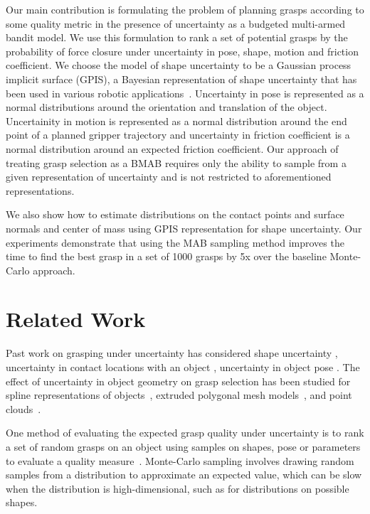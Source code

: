 \documentclass[journal,transmag]{IEEEtran}%
\begin{document}
Our main contribution is formulating the problem of planning grasps according to some quality metric in the presence of uncertainty as a budgeted multi-armed bandit model.
We use this formulation to rank a set of potential grasps by the probability of force closure \cite{christopoulos2007handling, kehoe2012toward} under uncertainty in pose, shape, motion and friction coefficient. 
We choose the model of shape uncertainty to be a Gaussian process implicit surface (GPIS), a Bayesian representation of shape uncertainty that has been used in various robotic applications~\cite{dragiev2011, hollinger2013}.  Uncertainty in pose is represented as a normal distributions around the orientation and translation of the object. Uncertainity in motion is represented as a normal distribution around the end point of a planned gripper trajectory and uncertainty in friction coefficient is a normal distribution around an expected friction coefficient.  Our approach of treating grasp selection as a BMAB requires only the ability to sample from a given representation of uncertainty and is not restricted to aforementioned representations. 

We also show how to estimate distributions on the contact points and surface normals and center of mass using GPIS representation for shape uncertainty. Our experiments demonstrate that using the MAB sampling method improves the time to find the best grasp in a set of 1000 grasps by 5x over the baseline Monte-Carlo approach. 

\section{Related Work}

Past work on grasping under uncertainty has considered shape uncertainty \cite{goldberg1990bayesian, stulp2011learning}, uncertainty in contact locations with an object \cite{zheng2005}, uncertainty in object pose \cite{christopoulos2007handling, weisz2012pose, kim2012physically}.
The effect of uncertainty in object geometry on grasp selection has been studied for spline representations of objects~\cite{christopoulos2007handling}, extruded polygonal mesh models~\cite{kehoe2012estimating, kehoe2012toward}, and point clouds~\cite{hsiao2011bayesian}.

One method of evaluating the expected grasp quality under uncertainty is to rank a set of random grasps on an object using  samples on shapes, pose or parameters to evaluate a quality measure~\cite{christopoulos2007handling, kehoe2012estimating, kehoe2012toward}.
Monte-Carlo sampling involves drawing random samples from a distribution to approximate an expected value\cite{caflisch1998monte}, which can be slow when the distribution is high-dimensional, such as for distributions on possible shapes.
\end{document}
